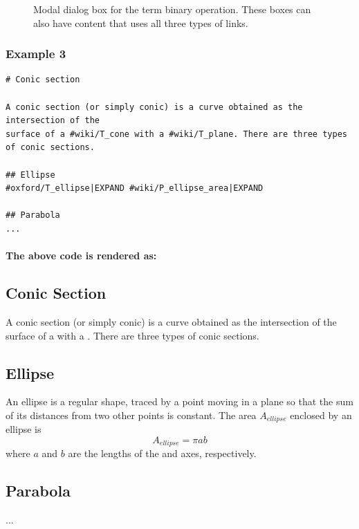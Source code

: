 \documentclass[a4paper]{article}
\begin{document}
\begin{figure}[htbp]
\begin{center}
\caption{Modal dialog box for the term binary operation. These boxes can also have content that uses all three types of links. }
\label{modal}
\end{center}
\end{figure}

\subsubsection*{Example 3}

\begin{verbatim}
# Conic section

A conic section (or simply conic) is a curve obtained as the intersection of the
surface of a #wiki/T_cone with a #wiki/T_plane. There are three types of conic sections.

## Ellipse
#oxford/T_ellipse|EXPAND #wiki/P_ellipse_area|EXPAND

## Parabola
...
\end{verbatim}

\paragraph{The above code is rendered as:}
\begin{mdframed}
\section*{Conic Section}
A conic section (or simply conic) is a curve obtained as the intersection of the surface of a  with a . There are three types of conic sections.

\subsection*{Ellipse}
An ellipse is a regular  shape, traced by a point moving in a plane so that the sum of its distances from two other points is constant. The area $A_{ellipse}$ enclosed by an ellipse is $$A_{ellipse} = \pi a b$$where $a$ and $b$ are the lengths of the  and  axes, respectively.

\subsection*{Parabola}
...

\end{mdframed}
\end{document}
